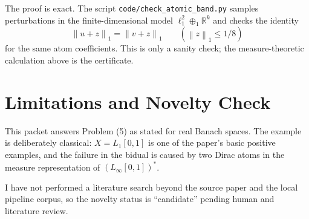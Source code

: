 \documentclass[11pt]{article}
\newcommand{\norm}[1]{\left\lVert #1 \right\rVert}
\newcommand{\R}{\mathbb{R}}
\begin{document}
The proof is exact. The script
\texttt{code/check\_atomic\_band.py} samples perturbations in the
finite-dimensional model $\ell_1^2\oplus_1\R^k$ and checks the identity
\[
  \norm{u+z}_1=\norm{v+z}_1
  \qquad(\norm{z}_1\le 1/8)
\]
for the same atom coefficients. This is only a sanity check; the
measure-theoretic calculation above is the certificate.

\section*{Limitations and Novelty Check}

This packet answers Problem (5) as stated for real Banach spaces. The
example is deliberately classical: $X=L_1[0,1]$ is one of the paper's
basic positive examples, and the failure in the bidual is caused by two
Dirac atoms in the measure representation of $(L_\infty[0,1])^*$.

I have not performed a literature search beyond the source paper and the
local pipeline corpus, so the novelty status is ``candidate'' pending
human and literature review.
\end{document}
